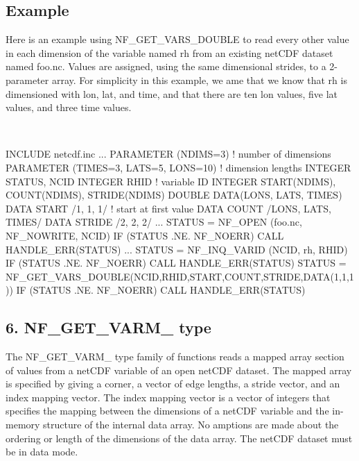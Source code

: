 \subsection*{Example }

Here is an example using N\+F\+\_\+\+G\+E\+T\+\_\+\+V\+A\+R\+S\+\_\+\+D\+O\+U\+B\+LE to read every other value in each dimension of the variable named rh from an existing net\+C\+DF dataset named foo.\+nc. Values are assigned, using the same dimensional strides, to a 2-\/parameter array. For simplicity in this example, we ame that we know that rh is dimensioned with lon, lat, and time, and that there are ten lon values, five lat values, and three time values.

 

I\+N\+C\+L\+U\+DE \textquotesingle{}netcdf.\+inc\textquotesingle{} ... P\+A\+R\+A\+M\+E\+T\+ER (N\+D\+I\+MS=3) ! number of dimensions P\+A\+R\+A\+M\+E\+T\+ER (T\+I\+M\+ES=3, L\+A\+TS=5, L\+O\+NS=10) ! dimension lengths I\+N\+T\+E\+G\+ER S\+T\+A\+T\+US, N\+C\+ID I\+N\+T\+E\+G\+ER R\+H\+ID ! variable ID I\+N\+T\+E\+G\+ER S\+T\+A\+R\+T(\+N\+D\+I\+M\+S), C\+O\+U\+N\+T(\+N\+D\+I\+M\+S), S\+T\+R\+I\+D\+E(\+N\+D\+I\+M\+S) D\+O\+U\+B\+LE D\+A\+T\+A(\+L\+O\+N\+S, L\+A\+T\+S, T\+I\+M\+E\+S) D\+A\+TA S\+T\+A\+RT /1, 1, 1/ ! start at first value D\+A\+TA C\+O\+U\+NT /\+L\+O\+NS, L\+A\+TS, T\+I\+M\+E\+S/ D\+A\+TA S\+T\+R\+I\+DE /2, 2, 2/ ... S\+T\+A\+T\+US = N\+F\+\_\+\+O\+P\+EN (\textquotesingle{}foo.\+nc\textquotesingle{}, N\+F\+\_\+\+N\+O\+W\+R\+I\+TE, N\+C\+ID) IF (S\+T\+A\+T\+US .NE. N\+F\+\_\+\+N\+O\+E\+RR) C\+A\+LL H\+A\+N\+D\+L\+E\+\_\+\+E\+R\+R(\+S\+T\+A\+T\+U\+S) ... S\+T\+A\+T\+US = N\+F\+\_\+\+I\+N\+Q\+\_\+\+V\+A\+R\+ID (N\+C\+ID, \textquotesingle{}rh\textquotesingle{}, R\+H\+ID) IF (S\+T\+A\+T\+US .NE. N\+F\+\_\+\+N\+O\+E\+RR) C\+A\+LL H\+A\+N\+D\+L\+E\+\_\+\+E\+R\+R(\+S\+T\+A\+T\+U\+S) S\+T\+A\+T\+US = N\+F\+\_\+\+G\+E\+T\+\_\+\+V\+A\+R\+S\+\_\+\+D\+O\+U\+B\+L\+E(\+N\+C\+I\+D,\+R\+H\+I\+D,\+S\+T\+A\+R\+T,\+C\+O\+U\+N\+T,\+S\+T\+R\+I\+D\+E,\+D\+A\+T\+A(1,1,1)) IF (S\+T\+A\+T\+US .NE. N\+F\+\_\+\+N\+O\+E\+RR) C\+A\+LL H\+A\+N\+D\+L\+E\+\_\+\+E\+R\+R(\+S\+T\+A\+T\+U\+S)

\subsection*{6. N\+F\+\_\+\+G\+E\+T\+\_\+\+V\+A\+R\+M\+\_\+ type }

The N\+F\+\_\+\+G\+E\+T\+\_\+\+V\+A\+R\+M\+\_\+ type family of functions reads a mapped array section of values from a net\+C\+DF variable of an open net\+C\+DF dataset. The mapped array is specified by giving a corner, a vector of edge lengths, a stride vector, and an index mapping vector. The index mapping vector is a vector of integers that specifies the mapping between the dimensions of a net\+C\+DF variable and the in-\/memory structure of the internal data array. No amptions are made about the ordering or length of the dimensions of the data array. The net\+C\+DF dataset must be in data mode.

